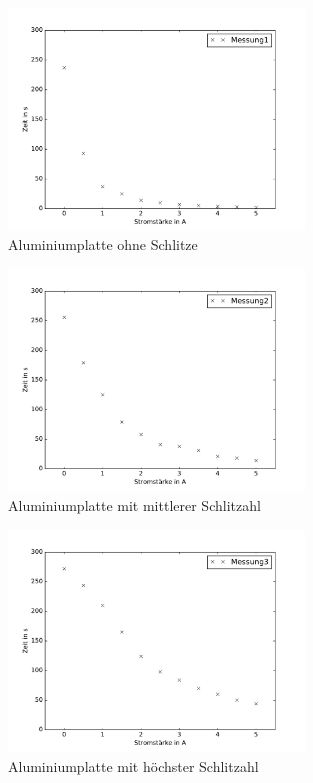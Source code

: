 \begin{figure}
  \centering
  \includegraphics[width=0.7\textwidth]{Messung1.pdf}
  \caption{Aluminiumplatte ohne Schlitze}
  \label{fig:Messung1}
\end{figure}

\begin{figure}
  \centering
  \includegraphics[width=0.7\textwidth]{Messung2.pdf}
  \caption{Aluminiumplatte mit mittlerer Schlitzahl}
  \label{fig:Messung1}
\end{figure}

\begin{figure}
  \centering
  \includegraphics[width=0.7\textwidth]{Messung3.pdf}
  \caption{Aluminiumplatte mit höchster Schlitzahl}
  \label{fig:Messung1}
\end{figure}

